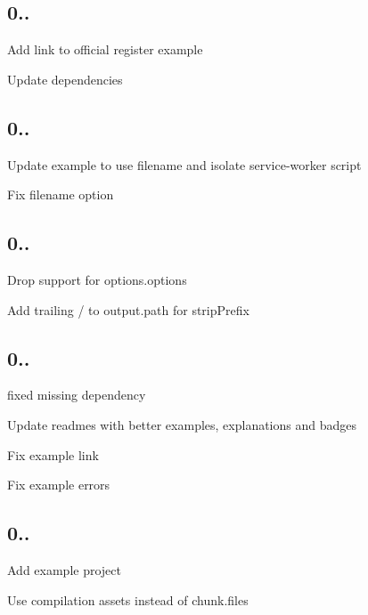 \subsection*{0..}


\begin{DoxyItemize}
\item Add link to official register example
\item Update dependencies
\end{DoxyItemize}

\subsection*{0..}


\begin{DoxyItemize}
\item Update example to use filename and isolate service-\/worker script
\item Fix filename option
\end{DoxyItemize}

\subsection*{0..}


\begin{DoxyItemize}
\item Drop support for options.\+options
\item Add trailing / to output.\+path for strip\+Prefix
\end{DoxyItemize}

\subsection*{0..}


\begin{DoxyItemize}
\item fixed missing dependency
\item Update readmes with better examples, explanations and badges
\item Fix example link
\item Fix example errors
\end{DoxyItemize}

\subsection*{0..}


\begin{DoxyItemize}
\item Add example project
\item Use compilation assets instead of chunk.\+files
\end{DoxyItemize}

